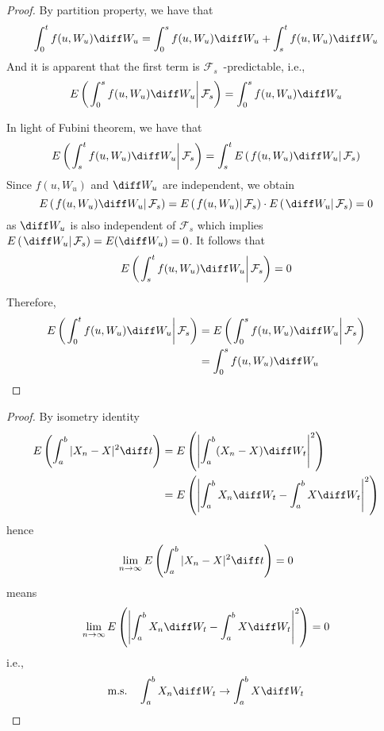     \problem
    \begin{proof}
        \newcommand{\conde}[1]{E\left(\left. #1\right|\mathcal F_s\right)}
        By partition property, we have that
        \[\int_0^tf(u,W_u)\diff W_u=\int_0^sf(u,W_u)\diff W_u
        +\int_s^tf(u,W_u)\diff W_u\]
        And it is apparent that the first term is
        $\mathcal F_s$~-predictable, i.e.,
        \[\conde{\int_0^sf(u,W_u)\diff W_u}=\int_0^sf(u,W_u)\diff W_u\]
        

        In light of Fubini theorem, we have that
        \[\conde{\int_s^tf(u,W_u)\diff W_u}
            =\int_s^t\conde{f(u,W_u)\diff W_u}\]
        Since $f(u,W_u)$ and $\diff W_u$ are independent, we obtain
        \[\conde{f(u,W_u)\diff W_u}=\conde{f(u,W_u)}\cdot\conde{\diff W_u}
        =0\]
        as $\diff W_u$ is also independent of $\mathcal F_s$ which implies
        $\conde{\diff W_u}=E(\diff W_u)=0$. It follows that
        \[\conde{\int_s^tf(u,W_u)\diff W_u}=0\]

        Therefore,
        \[\begin{aligned}
        \conde{\int_0^tf(u,W_u)\diff W_u}
        &=\conde{\int_0^sf(u,W_u)\diff W_u}\\
        &=\int_0^sf(u,W_u)\diff W_u
        \end{aligned}\]
    \end{proof}


    \problem
    \begin{proof}
        By isometry identity
        \[\begin{aligned}
            E\left(\int_a^b|X_n-X|^2\diff t\right)
            &=E\left(\left|\int_a^b(X_n-X)\diff W_t\right|^2\right)\\
            &=E\left(\left|
            \int_a^bX_n\diff W_t-\int_a^bX\diff W_t
            \right|^2\right)
        \end{aligned}\]
        hence
        \[\lim_{n\to\infty}E\left(
            \int_a^b|X_n-X|^2\diff t\right)=0\]
        means
        \[\lim_{n\to\infty}E\left(\left|
            \int_a^bX_n\diff W_t-\int_a^bX\diff W_t
            \right|^2\right)=0\]
        i.e.,
        \[\text{m.s.}\quad
        \int_a^bX_n\diff W_t\to\int_a^bX\diff W_t\]
    \end{proof}

